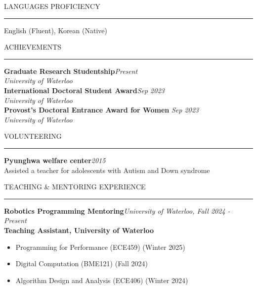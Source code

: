 \documentclass{resume} %
\renewenvironment{rSection}[1]{
\sectionskip
\textcolor{CarnegieMellonRed}{\MakeUppercase{#1}}
\sectionlineskip
\hrule
\begin{list}{}{
\setlength{\leftmargin}{1.5em}
}
\item[]
}{
\end{list}
}
\begin{document}
\begin{rSection}{Languages Proficiency} \itemsep -2pt
English (Fluent), Korean (Native)
\end{rSection}



\begin{rSection}{Achievements} \itemsep -2pt
\large{\textbf{{Graduate Research Studentship}}}\hfill {\em Present} \\
\emph{{University of Waterloo}}\\
\large{\textbf{{International Doctoral Student Award}}}\hfill {\em Sep 2023} \\
\emph{{University of Waterloo}}\\
\large{\textbf{{Provost's Doctoral Entrance Award for Women }}}\hfill {\em Sep 2023} \\
\emph{{University of Waterloo}}\\
\end{rSection}

\begin{rSection}{Volunteering} \itemsep -2pt
\large{\textbf{Pyunghwa welfare center}}\hfill {\em 2015} \\
\small{Assisted a teacher for adolescents with Autism and Down syndrome}
\end{rSection}

\begin{rSection}{TEACHING \& MENTORING EXPERIENCE} \itemsep -2pt
{\textbf{Robotics Programming Mentoring}}\hfill {\em University of Waterloo, Fall 2024 - Present} \\
{\textbf{Teaching Assistant, University of Waterloo}}
\begin{itemize}
    \item []Programming for Performance (ECE459) (Winter 2025)
    \item []Digital Computation (BME121) (Fall 2024)
    \item []Algorithm Design and Analysis (ECE406) (Winter 2024)
\end{itemize}



\end{rSection}
\end{document}
